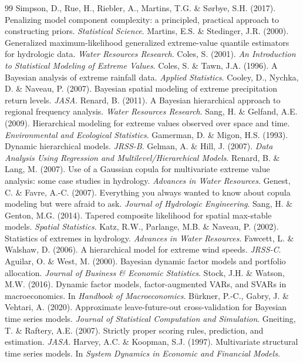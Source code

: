 \documentclass[11pt]{article}
\begin{document}
\begin{thebibliography}{99}
 Simpson, D., Rue, H., Riebler, A., Martins, T.G. \& S{\o}rbye, S.H. (2017). Penalizing model component complexity: a principled, practical approach to constructing priors. \emph{Statistical Science}.
 Martins, E.S. \& Stedinger, J.R. (2000). Generalized maximum-likelihood generalized extreme-value quantile estimators for hydrologic data. \emph{Water Resources Research}.
 Coles, S. (2001). \emph{An Introduction to Statistical Modeling of Extreme Values}.
 Coles, S. \& Tawn, J.A. (1996). A Bayesian analysis of extreme rainfall data. \emph{Applied Statistics}.
 Cooley, D., Nychka, D. \& Naveau, P. (2007). Bayesian spatial modeling of extreme precipitation return levels. \emph{JASA}.
 Renard, B. (2011). A Bayesian hierarchical approach to regional frequency analysis. \emph{Water Resources Research}.
 Sang, H. \& Gelfand, A.E. (2009). Hierarchical modeling for extreme values observed over space and time. \emph{Environmental and Ecological Statistics}.
 Gamerman, D. \& Migon, H.S. (1993). Dynamic hierarchical models. \emph{JRSS-B}.
 Gelman, A. \& Hill, J. (2007). \emph{Data Analysis Using Regression and Multilevel/Hierarchical Models}.
 Renard, B. \& Lang, M. (2007). Use of a Gaussian copula for multivariate extreme value analysis: some case studies in hydrology. \emph{Advances in Water Resources}.
 Genest, C. \& Favre, A.-C. (2007). Everything you always wanted to know about copula modeling but were afraid to ask. \emph{Journal of Hydrologic Engineering}.
 Sang, H. \& Genton, M.G. (2014). Tapered composite likelihood for spatial max-stable models. \emph{Spatial Statistics}.
 Katz, R.W., Parlange, M.B. \& Naveau, P. (2002). Statistics of extremes in hydrology. \emph{Advances in Water Resources}.
 Fawcett, L. \& Walshaw, D. (2006). A hierarchical model for extreme wind speeds. \emph{JRSS-C}.
 Aguilar, O. \& West, M. (2000). Bayesian dynamic factor models and portfolio allocation. \emph{Journal of Business \& Economic Statistics}.
 Stock, J.H. \& Watson, M.W. (2016). Dynamic factor models, factor-augmented VARs, and SVARs in macroeconomics. In \emph{Handbook of Macroeconomics}.
 B\"urkner, P.-C., Gabry, J. \& Vehtari, A. (2020). Approximate leave-future-out cross-validation for Bayesian time series models. \emph{Journal of Statistical Computation and Simulation}.
 Gneiting, T. \& Raftery, A.E. (2007). Strictly proper scoring rules, prediction, and estimation. \emph{JASA}.
 Harvey, A.C. \& Koopman, S.J. (1997). Multivariate structural time series models. In \emph{System Dynamics in Economic and Financial Models}.
\end{thebibliography}
\end{document}
